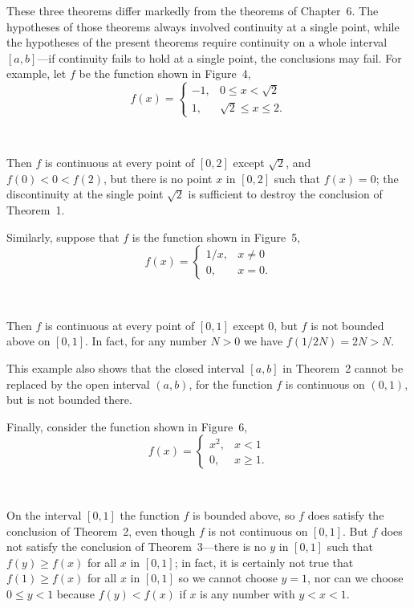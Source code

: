 These three theorems differ markedly from the theorems of Chapter~6. The
hypotheses of those theorems always involved continuity at a single point, while
the hypotheses of the present theorems require continuity on a whole interval
$[a,b]$---if continuity fails to hold at a single point, the conclusions may fail.
For example, let $f$ be the function shown in Figure~4,
\[
f(x)=\begin{cases}
-1, & 0\leq x<\sqrt{2}\\
1,  & \sqrt{2}\leq x\leq 2.
\end{cases}
\]
\begin{center}
\\[0.6em]
\end{center}
Then $f$ is continuous at every point of $[0,2]$ except $\sqrt{2}$, and
$f(0)<0<f(2)$, but there is no point $x$ in $[0,2]$ such that $f(x)=0$; the
discontinuity at the single point $\sqrt{2}$ is sufficient to destroy the
conclusion of Theorem~1.

Similarly, suppose that $f$ is the function shown in Figure~5,
\[
f(x)=\begin{cases}
1/x, & x\neq 0\\
0,   & x=0.
\end{cases}
\]
\begin{center}
\\[0.6em]
\end{center}
Then $f$ is continuous at every point of $[0,1]$ except $0$, but $f$ is not
bounded above on $[0,1]$. In fact, for any number $N>0$ we have
$f(1/2N)=2N>N$.

This example also shows that the closed interval $[a,b]$ in Theorem~2 cannot be
replaced by the open interval $(a,b)$, for the function $f$ is continuous on
$(0,1)$, but is not bounded there.

Finally, consider the function shown in Figure~6,
\[
f(x)=\begin{cases}
x^2, & x<1\\
0,   & x\geq 1.
\end{cases}
\]
\begin{center}
\\[0.6em]
\end{center}
On the interval $[0,1]$ the function $f$ is bounded above, so $f$ does satisfy
the conclusion of Theorem~2, even though $f$ is not continuous on $[0,1]$. But
$f$ does not satisfy the conclusion of Theorem~3---there is no $y$ in $[0,1]$
such that $f(y)\geq f(x)$ for all $x$ in $[0,1]$; in fact, it is certainly not
true that $f(1)\geq f(x)$ for all $x$ in $[0,1]$ so we cannot choose $y=1$, nor
can we choose $0\leq y<1$ because $f(y)<f(x)$ if $x$ is any number with
$y<x<1$.

